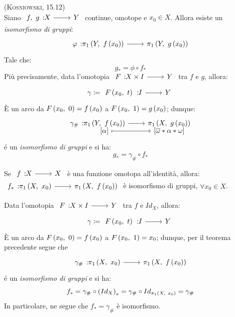 \begin{theorema}\textsc{(Kosniowski, 15.12)}\\
Siano $\funz{f,\ g}{X}{Y}$ continue, omotope e $x_0\in X$. Allora esiste un \textit{isomorfismo di gruppi}:
\begin{equation}
	\funz{\phi}{\gruf{Y}{f\left(x_0\right)}}{\gruf{Y}{g\left(x_0\right)}}
\end{equation}
Tale che:
\begin{equation}
	g_{\ast}=\phi\circ f_{\ast}
\end{equation}
Più precisamente, data l'omotopia $\funz{F}{X\times I}{Y}$ tra $f$ e $g$, allora:
\begin{equation}
\gamma\coloneqq \funz{\mvf{F}{x_0}{t}}{I}{Y}
\end{equation}
È un arco da $F\left(x_0,\ 0\right)=f\left(x_0\right)$ a $F\left(x_0,\ 1\right)=g\left(x_0\right)$; dunque:
\begin{equation}
	\funztot{\gamma_{\#}}{\gruf{Y}{f\left(x_0\right)}}{\gruf{X}{g\left(x_0\right)}}{\left[\alpha\right]}{\left[\overline{\omega}\ast\alpha\ast\omega\right]}
\end{equation}
é un \textit{isomorfismo di gruppi} e si ha:
\begin{equation}
	g_{\ast}=\gamma_{\#}\circ f_{\ast}
\end{equation}
\begin{center}
\end{center}
\vspace{-6mm}
\end{theorema}
\begin{corollary}
	Se $\funz{f}{X}{X}$ è una funzione omotopa all'identità, allora:\\ $\funz{f_{\ast}}{\gruf{X}{x_0}}{\gruf{X}{f\left(x_0\right)}}$ è isomorfismo di gruppi, $\forall x_0\in X$.
\end{corollary}
\begin{demonstration}
	Data l'omotopia $\funz{F}{X\times I}{Y}$ tra $f$ e $Id_X$, allora:
	\begin{equation*}
		\gamma\coloneqq \funz{\mvf{F}{x_0}{t}}{I}{Y}
	\end{equation*}
È un arco da $F\left(x_0,\ 0\right)=f\left(x_0\right)$ a $F\left(x_0,\ 1\right)=x_0$; dunque, per il teorema precedente segue che 
\begin{equation*}
	\funz{\gamma_{\#}}{\gruf{X}{x_0}}{\gruf{X}{f\left(x_0\right)}}
\end{equation*}
é un \textit{isomorfismo di gruppi} e si ha:
\begin{equation*}
f_{\ast}=\gamma_{\#}\circ \left(Id_X\right)_{\ast}=\gamma_{\#}\circ Id_{\gruf{X}{x_0}}=\gamma_{\#}
\end{equation*}
In particolare, ne segue che $f_{\ast}=\gamma_{\#}$ è isomorfismo.
\end{demonstration}
